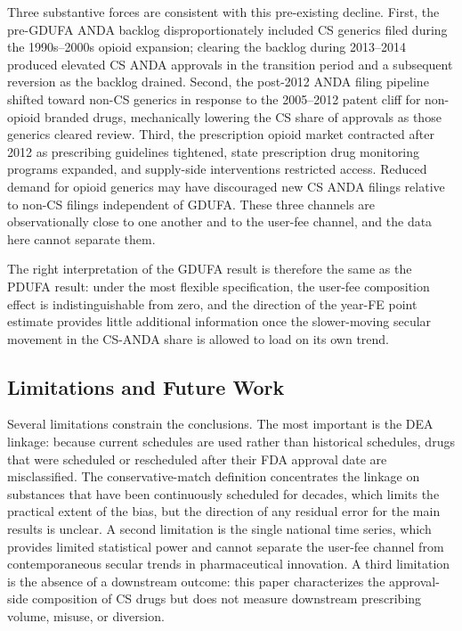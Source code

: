 Three substantive forces are consistent with this pre-existing decline. First, the pre-GDUFA ANDA backlog disproportionately included CS generics filed during the 1990s--2000s opioid expansion; clearing the backlog during 2013--2014 produced elevated CS ANDA approvals in the transition period and a subsequent reversion as the backlog drained. Second, the post-2012 ANDA filing pipeline shifted toward non-CS generics in response to the 2005--2012 patent cliff for non-opioid branded drugs, mechanically lowering the CS share of approvals as those generics cleared review. Third, the prescription opioid market contracted after 2012 as prescribing guidelines tightened, state prescription drug monitoring programs expanded, and supply-side interventions restricted access. Reduced demand for opioid generics may have discouraged new CS ANDA filings relative to non-CS filings independent of GDUFA. These three channels are observationally close to one another and to the user-fee channel, and the data here cannot separate them.

The right interpretation of the GDUFA result is therefore the same as the PDUFA result: under the most flexible specification, the user-fee composition effect is indistinguishable from zero, and the direction of the year-FE point estimate provides little additional information once the slower-moving secular movement in the CS-ANDA share is allowed to load on its own trend.

\subsection{Limitations and Future Work}

Several limitations constrain the conclusions. The most important is the DEA linkage: because current schedules are used rather than historical schedules, drugs that were scheduled or rescheduled after their FDA approval date are misclassified. The conservative-match definition concentrates the linkage on substances that have been continuously scheduled for decades, which limits the practical extent of the bias, but the direction of any residual error for the main results is unclear. A second limitation is the single national time series, which provides limited statistical power and cannot separate the user-fee channel from contemporaneous secular trends in pharmaceutical innovation. A third limitation is the absence of a downstream outcome: this paper characterizes the approval-side composition of CS drugs but does not measure downstream prescribing volume, misuse, or diversion.


